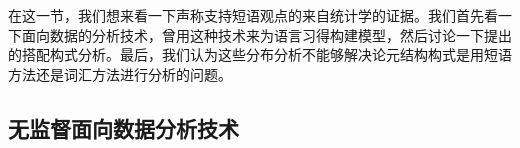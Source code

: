 \begin{exe}
\begin{xlist}[iv.]
\begin{exe}
\begin{xlist}[iv.]
在这一节，我们想来看一下声称支持短语观点的来自统计学的证据。我们首先看一下面向数据的分析技术，\citet{Bod2009a}曾用这种技术来为语言习得构建模型，然后讨论一下\citet{SG2009a}提出的搭配构式分析。最后，我们认为这些分布分析不能够解决论元结构构式是用短语方法还是词汇方法进行分析的问题。

\subsection{无监督面向数据分析技术}
\label{Abschnitt-U-Dop-phrasal}


\end{xlist}
\end{exe}
\end{xlist}
\end{exe}
